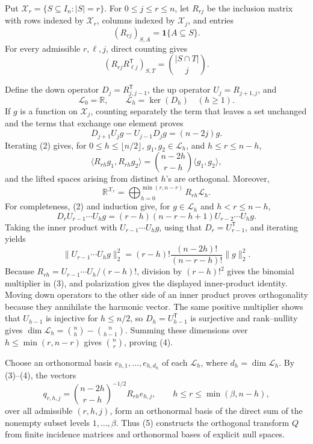 Put \(\mathcal X_r=\{S\subseteq I_n:|S|=r\}\).  For \(0\le j\le r\le n\), let \(R_{rj}\) be the inclusion matrix with rows indexed by \(\mathcal X_r\), columns indexed by \(\mathcal X_j\), and entries
\[
(R_{rj})_{S,A}=\mathbf 1\{A\subseteq S\}.
\]
For every admissible \(r,\ell,j\), direct counting gives
\[
(R_{rj}R_{\ell j}^{\mathsf T})_{S,T}=\binom{|S\cap T|}{j}.
\tag{1}
\]

Define the down operator \(D_j=R_{j,j-1}^{\mathsf T}\), the up operator \(U_j=R_{j+1,j}\), and
\[
\mathcal L_0=\mathbb R,
\qquad
\mathcal L_h=\ker(D_h)\quad(h\ge1).
\]
If \(g\) is a function on \(\mathcal X_j\), counting separately the term that leaves a set unchanged and the terms that exchange one element proves
\[
D_{j+1}U_jg-U_{j-1}D_jg=(n-2j)g.
\tag{2}
\]
Iterating (2) gives, for \(0\le h\le\lfloor n/2\rfloor\), \(g_1,g_2\in\mathcal L_h\), and \(h\le r\le n-h\),
\[
\langle R_{rh}g_1,R_{rh}g_2\rangle
=\binom{n-2h}{r-h}\langle g_1,g_2\rangle,
\tag{3}
\]
and the lifted spaces arising from distinct \(h\)'s are orthogonal.  Moreover,
\[
\mathbb R^{\mathcal X_r}
=\bigoplus_{h=0}^{\min(r,n-r)}R_{rh}\mathcal L_h.
\tag{4}
\]
For completeness, (2) and induction give, for \(g\in\mathcal L_h\) and \(h<r\le n-h\),
\[
D_rU_{r-1}\cdots U_hg
=(r-h)(n-r-h+1)U_{r-2}\cdots U_hg.
\]
Taking the inner product with \(U_{r-1}\cdots U_hg\), using that \(D_r=U_{r-1}^{\mathsf T}\), and iterating yields
\[
\|U_{r-1}\cdots U_hg\|_2^2
=(r-h)!\frac{(n-2h)!}{(n-r-h)!}\|g\|_2^2.
\]
Because \(R_{rh}=U_{r-1}\cdots U_h/(r-h)!\), division by \((r-h)!^2\) gives the binomial multiplier in (3), and polarization gives the displayed inner-product identity.  Moving down operators to the other side of an inner product proves orthogonality because they annihilate the harmonic vector.  The same positive multiplier shows that \(U_{h-1}\) is injective for \(h\le n/2\), so \(D_h=U_{h-1}^{\mathsf T}\) is surjective and rank--nullity gives \(\dim\mathcal L_h=\binom nh-\binom n{h-1}\).  Summing these dimensions over \(h\le\min(r,n-r)\) gives \(\binom nr\), proving (4).

Choose an orthonormal basis \(e_{h,1},\ldots,e_{h,d_h}\) of each \(\mathcal L_h\), where \(d_h=\dim\mathcal L_h\).  By (3)--(4), the vectors
\[
q_{r,h,j}
=\binom{n-2h}{r-h}^{-1/2}R_{rh}e_{h,j},
\qquad
h\le r\le\min(\beta,n-h),
\tag{5}
\]
over all admissible \((r,h,j)\), form an orthonormal basis of the direct sum of the nonempty subset levels \(1,\ldots,\beta\).  Thus (5) constructs the orthogonal transform \(Q\) from finite incidence matrices and orthonormal bases of explicit null spaces.

